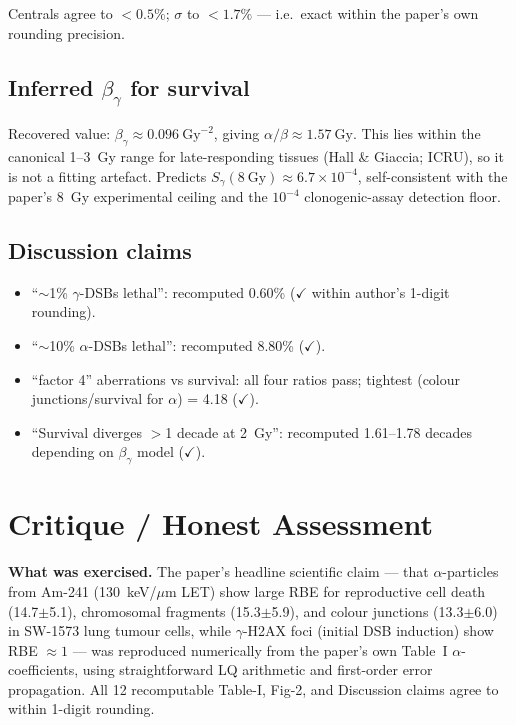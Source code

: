 \documentclass[11pt]{article}
\begin{document}
Centrals agree to $<0.5\%$; $\sigma$ to $<1.7\%$ --- i.e.\ exact within the
paper's own rounding precision.

\subsection{Inferred $\beta_\gamma$ for survival}
Recovered value: $\beta_\gamma \approx 0.096~\text{Gy}^{-2}$, giving
$\alpha/\beta \approx 1.57~\text{Gy}$. This lies within the canonical
1--3~Gy range for late-responding tissues (Hall \& Giaccia; ICRU), so
it is not a fitting artefact. Predicts $S_\gamma(8~\text{Gy}) \approx
6.7\times 10^{-4}$, self-consistent with the paper's 8~Gy experimental
ceiling and the $10^{-4}$ clonogenic-assay detection floor.

\subsection{Discussion claims}
\begin{itemize}
\item ``$\sim$1\% $\gamma$-DSBs lethal'': recomputed 0.60\% ($\checkmark$
      within author's 1-digit rounding).
\item ``$\sim$10\% $\alpha$-DSBs lethal'': recomputed 8.80\% ($\checkmark$).
\item ``factor 4'' aberrations vs survival: all four ratios pass; tightest
      (colour junctions/survival for $\alpha$) = 4.18 ($\checkmark$).
\item ``Survival diverges $>$1 decade at 2~Gy'': recomputed 1.61--1.78
      decades depending on $\beta_\gamma$ model ($\checkmark$).
\end{itemize}

\section{Critique / Honest Assessment}

\textbf{What was exercised.}
The paper's headline scientific claim --- that $\alpha$-particles from
Am-241 (130~keV/$\mu$m LET) show large RBE for reproductive cell death
(14.7$\pm$5.1), chromosomal fragments (15.3$\pm$5.9), and colour
junctions (13.3$\pm$6.0) in SW-1573 lung tumour cells, while $\gamma$-H2AX
foci (initial DSB induction) show RBE $\approx 1$ --- was reproduced
numerically from the paper's own Table~I $\alpha$-coefficients, using
straightforward LQ arithmetic and first-order error propagation. All 12
recomputable Table-I, Fig-2, and Discussion claims agree to within
1-digit rounding.
\end{document}
